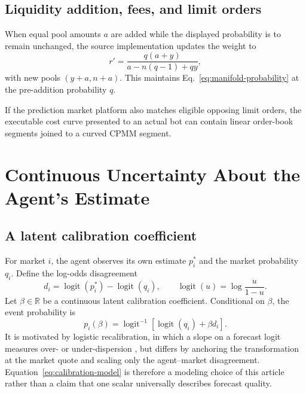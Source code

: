 \documentclass[journal, a4paper]{IEEEtran}
\begin{document}
\subsection{Liquidity addition, fees, and limit orders}
When equal pool amounts $a$ are added while the displayed probability is to remain unchanged, the source implementation updates the weight to
\begin{equation}
r'
=
\frac{q(a+y)}{a-n(q-1)+q y},
\label{eq:manifold-liquidity-weight}
\end{equation}
with new pools $(y+a,n+a)$. This maintains Eq.~\eqref{eq:manifold-probability} at the pre-addition probability $q$.


If the prediction market platform also matches eligible opposing limit orders,  the executable cost curve presented to an actual bot can contain linear order-book segments joined to a curved CPMM segment.

\section{Continuous Uncertainty About the Agent's Estimate}
\subsection{A latent calibration coefficient}
For market $i$, the agent observes its own estimate $p_i^*$ and the market probability $q_i$. Define the log-odds disagreement
\begin{equation}
d_i
=
\operatorname{logit}(p_i^*)-
\operatorname{logit}(q_i),
\qquad
\operatorname{logit}(u)=\log\frac{u}{1-u}.
\label{eq:disagreement}
\end{equation}
Let $\beta\in\mathbb{R}$ be a continuous latent calibration coefficient. Conditional on $\beta$, the event probability is
\begin{equation}
p_i(\beta)
=
\operatorname{logit}^{-1}
\left[
\operatorname{logit}(q_i)+\beta d_i
\right].
\label{eq:calibration-model}
\end{equation}
It is motivated by logistic recalibration, in which a slope on a forecast logit measures over- or under-dispersion \cite{cox1958,dawid1982}, but differs by anchoring the transformation at the market quote and scaling only the agent--market disagreement. Equation~\eqref{eq:calibration-model} is therefore a modeling choice of this article rather than a claim that one scalar universally describes forecast quality.
\end{document}
